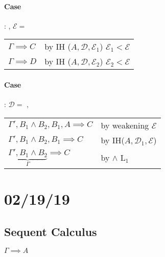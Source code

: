\documentclass[12 pt]{article}
\begin{document}
	\paragraph{Case}: \noLine{}\DP, $\mathcal{E} =$\noLine{}\noLine{}\DP
	\\
	\begin{tabular}{l l}
		$\Gamma \implies C$ & by IH ($A, \mathcal{D}, \mathcal{E}_1$) $\mathcal{E}_1 < \mathcal{E}$
		\\ $\Gamma \implies D$ & by IH ($A, \mathcal{D}, \mathcal{E}_2$) $\mathcal{E}_2 < \mathcal{E}$
	\end{tabular}

	\paragraph{Case}: $\mathcal{D}=$
	\noLine{}\DP,
	\noLine{}\DP
	\\
	\begin{tabular}{l l}
		$\Gamma', B_1 \land B_2, B_1, A \implies C$ & by weakening $\mathcal{E}$
		\\ $\Gamma', B_1 \land B_2, B_1 \implies C$ & by IH($A, \mathcal{D}_1, \mathcal{E}$)
		\\ $\underbrace{\Gamma', B_1 \land B_2}_{\Gamma} \implies C$ & by $\land$ L$_1$
	\end{tabular}
	\section{02/19/19}
	\subsection{Sequent Calculus} $\Gamma \implies A$

	\DP
	\DP
	\DP
	\DP
\end{document}
